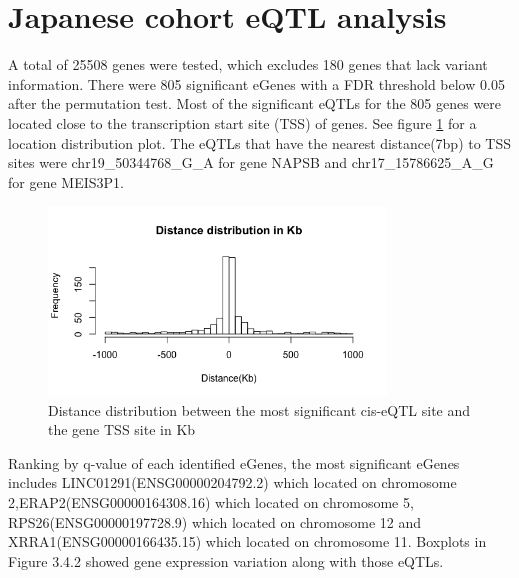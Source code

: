 \section{Japanese cohort eQTL analysis}
\label{eQTL}

A total of 25508 genes were tested, which excludes 180 genes that lack variant information. There were 805 significant eGenes with a FDR threshold below 0.05 after the permutation test. Most of the significant eQTLs for the 805 genes were located close to the transcription start site (TSS) of genes. See figure \ref{TSS} for a location distribution plot. The eQTLs that have the nearest distance(7bp) to TSS sites were chr19\_50344768\_G\_A for gene NAPSB and chr17\_15786625\_A\_G for gene MEIS3P1.

\begin{figure}[h]
\centering
\includegraphics[width=0.8\textwidth]{figures/TSS.png}
\caption{Distance distribution between the most significant cis-eQTL site and the gene TSS site in Kb}
\label{TSS}
\end{figure}

Ranking by q-value of each identified eGenes, the most significant eGenes includes LINC01291(ENSG00000204792.2) which located on chromosome 2,ERAP2(ENSG00000164308.16) which located on chromosome 5, RPS26(ENSG00000197728.9) which located on chromosome 12 and XRRA1(ENSG00000166435.15) which located on chromosome 11. Boxplots in Figure 3.4.2 showed gene expression variation along with those eQTLs.

